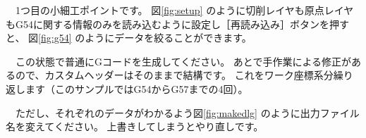 

\vspace*{1zh}
　1つ目の小細工ポイントです。
図\ref{fig:setup} のように切削レイヤも原点レイヤもG54に関する情報のみを読み込むように設定し［再読み込み］ボタンを押すと、
図\ref{fig:g54} のようにデータを絞ることができます。



　この状態で普通にGコードを生成してください。
あとで手作業による修正があるので、カスタムヘッダーはそのままで結構です。
これをワーク座標系分繰り返します（このサンプルではG54からG57までの4回）。

　ただし、それぞれのデータがわかるよう図\ref{fig:makedlg} のように出力ファイル名を変えてください。
上書きしてしまうとやり直しです。

